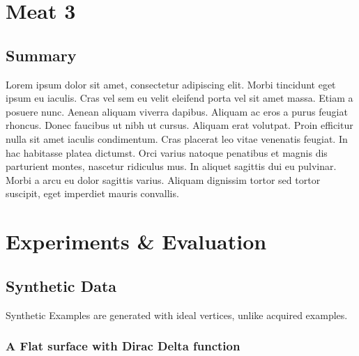 \documentclass[openany]{book}
\begin{document}
\chapter{Meat 3}
\section{Summary}
Lorem ipsum dolor sit amet, consectetur adipiscing elit. Morbi tincidunt eget 
ipsum eu iaculis. Cras vel sem eu velit eleifend porta vel sit amet massa. Etiam 
a posuere nunc. Aenean aliquam viverra dapibus. Aliquam ac eros a purus feugiat 
rhoncus. Donec faucibus ut nibh ut cursus. Aliquam erat volutpat. Proin efficitur 
nulla sit amet iaculis condimentum. Cras placerat leo vitae venenatis feugiat. In 
hac habitasse platea dictumst. Orci varius natoque penatibus et magnis dis 
parturient montes, nascetur ridiculus mus. In aliquet sagittis dui eu pulvinar. 
Morbi a arcu eu dolor sagittis varius. Aliquam dignissim tortor sed tortor 
suscipit, eget imperdiet mauris convallis.



\chapter{Experiments \& Evaluation}
\section{Synthetic Data}
Synthetic Examples are generated with ideal vertices, unlike acquired examples.

\subsection{A Flat surface with Dirac Delta function}
\end{document}
